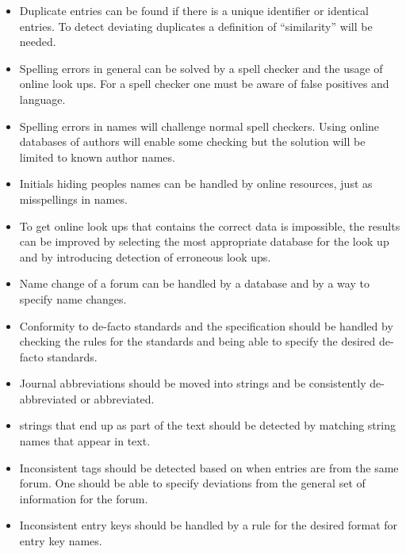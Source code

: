 \begin{itemize}
\item Duplicate entries can be found if there is a unique identifier
  or identical entries.  To detect deviating duplicates a definition
  of ``similarity'' will be needed.

\item Spelling errors in general can be solved by a spell checker and
  the usage of online look ups.  For a spell checker one must be aware
  of false positives and language.

\item Spelling errors in names will challenge normal spell checkers.
  Using online databases of authors will enable some checking but the
  solution will be limited to known author names.

\item Initials hiding peoples names can be handled by online
  resources, just as misspellings in names.

\item To get online look ups that contains the correct data is
  impossible, the results can be improved by selecting the most
  appropriate database for the look up and by introducing detection of
  erroneous look ups.

\item Name change of a forum can be handled by a database and by a way
  to specify name changes.

\item Conformity to de-facto standards and the {\bibtex} specification
  should be handled by checking the rules for the standards and being
  able to specify the desired de-facto standards.

\item Journal abbreviations should be moved into strings and be
  consistently de-abbreviated or abbreviated.

\item {\bibtex} strings that end up as part of the text should be
  detected by matching string names that appear in text.

\item Inconsistent tags should be detected based on when entries are
  from the same forum.  One should be able to specify deviations from
  the general set of information for the forum.

\item Inconsistent entry keys should be handled by a rule for the
  desired format for entry key names.
\end{itemize}


